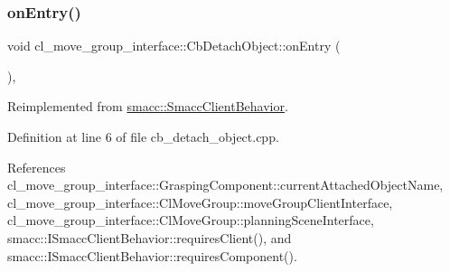 \subsubsection{\texorpdfstring{on\+Entry()}{onEntry()}}
{\footnotesize\ttfamily void cl\+\_\+move\+\_\+group\+\_\+interface\+::\+Cb\+Detach\+Object\+::on\+Entry (\begin{DoxyParamCaption}{ }\end{DoxyParamCaption})\hspace{0.3cm}{\ttfamily [override]}, {\ttfamily [virtual]}}



Reimplemented from \hyperlink{classsmacc_1_1SmaccClientBehavior_ad5d3e1f1697c3cfe66c94cadba948493}{smacc\+::\+Smacc\+Client\+Behavior}.



Definition at line 6 of file cb\+\_\+detach\+\_\+object.\+cpp.



References cl\+\_\+move\+\_\+group\+\_\+interface\+::\+Grasping\+Component\+::current\+Attached\+Object\+Name, cl\+\_\+move\+\_\+group\+\_\+interface\+::\+Cl\+Move\+Group\+::move\+Group\+Client\+Interface, cl\+\_\+move\+\_\+group\+\_\+interface\+::\+Cl\+Move\+Group\+::planning\+Scene\+Interface, smacc\+::\+I\+Smacc\+Client\+Behavior\+::requires\+Client(), and smacc\+::\+I\+Smacc\+Client\+Behavior\+::requires\+Component().


